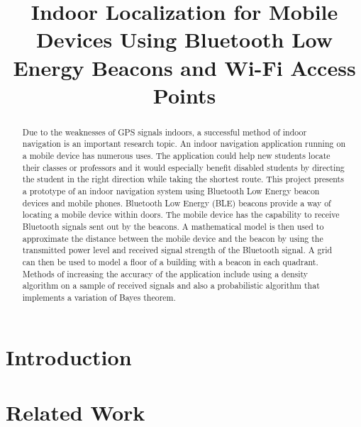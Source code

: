 \documentclass[conference]{IEEEtran}
\begin{document}
\title{Indoor Localization for Mobile Devices Using Bluetooth Low Energy Beacons and Wi-Fi Access Points}

\author{
\and
{}
}

\maketitle

\begin{abstract}
Due to the weaknesses of GPS signals indoors, a successful method of indoor
navigation is an important research topic. An indoor navigation application
running on a mobile device has numerous uses. The application could help new
students locate their classes or professors and it would especially benefit
disabled students by directing the student in the right direction while taking
the shortest route. This project presents a prototype of an indoor navigation
system using Bluetooth Low Energy beacon devices and mobile phones.
Bluetooth Low Energy (BLE) beacons provide a way of locating a mobile device
within doors. The mobile device has the capability to receive Bluetooth signals
sent out by the beacons. A mathematical model is then used to approximate the
distance between the mobile device and the beacon by using the transmitted
power level and received signal strength of the Bluetooth signal. A grid can
then be used to model a floor of a building with a beacon in each quadrant.
Methods of increasing the accuracy of the application include using a density
algorithm on a sample of received signals and also a probabilistic algorithm
that implements a variation of Bayes theorem.
\end{abstract}

\section{Introduction}

\section{Related Work}
\end{document}
